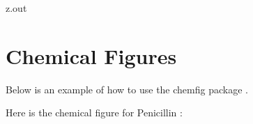 \MyIOT


\begin{VerbatimOut}{z.out}


\section{Chemical Figures}

Below is an example of how to use the chemfig package \cite{tellechea2019}.

Here is the chemical figure
for Penicillin \cite[pages~72--73]{tellechea2019}:\\

\end{VerbatimOut}

\MyIOT
